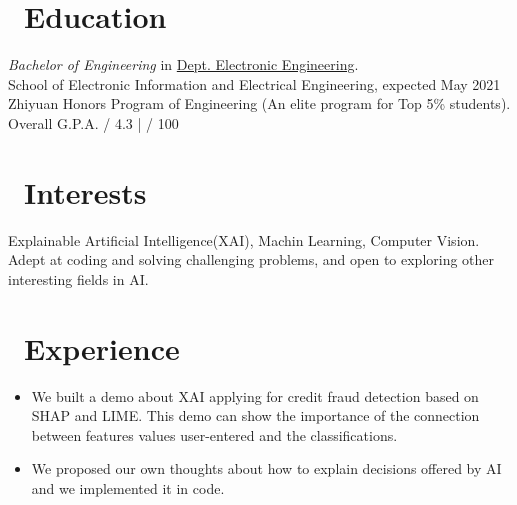 \documentclass{resume}
\begin{document}



\section{\faGraduationCap\ Education}
\textit{Bachelor of Engineering} in \href{http://ee.sjtu.edu.cn/EN/Default.aspx}{Dept. Electronic Engineering}.\\
School of Electronic Information and Electrical Engineering, expected May 2021\\
Zhiyuan Honors Program of Engineering (An elite program for Top 5\% students).\\
Overall G.P.A.\quad  3.68 / 4.3 \quad | \quad 85.2 / 100

\section{\faStar\ Interests}
Explainable Artificial Intelligence(XAI), Machin Learning, Computer Vision.\\
Adept at coding and solving challenging problems, and open to exploring other interesting fields in AI.

\section{\faUsers\ Experience}

\begin{itemize}
  \item We built a demo about XAI applying for credit fraud detection based on SHAP and LIME. This demo can show the importance of the connection between features values user-entered and the classifications.
  \item We proposed our own thoughts about how to explain decisions offered by AI and we implemented it in code.
\end{itemize}
\end{document}
